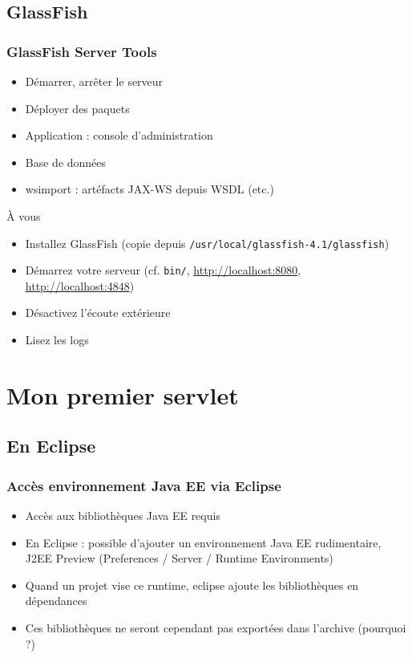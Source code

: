 \documentclass[english, french]{beamer}
\begin{document}
\subsection{GlassFish}
\begin{frame}
	\frametitle{GlassFish Server Tools}
	\begin{itemize}
		\item Démarrer, arrêter le serveur
		\item Déployer des paquets
		\item Application : console d’administration
		\item Base de données
		\item wsimport : artéfacts JAX-WS depuis WSDL (etc.)
	\end{itemize}
	\begin{block}{À vous}
		\begin{itemize}
			\item \og{}Installez\fg{} GlassFish (copie depuis \texttt{/usr/local/glassfish-4.1/glassfish})
			\item Démarrez votre serveur (cf. \texttt{bin/}, \url{http://localhost:8080}, \url{http://localhost:4848})
			\item Désactivez l’écoute extérieure
			\item Lisez les logs
		\end{itemize}
	\end{block}
\end{frame}

\section{Mon premier servlet}
\subsection{En Eclipse}
\begin{frame}
	\frametitle{Accès environnement Java EE via Eclipse}
	\begin{itemize}
		\item Accès aux bibliothèques Java EE requis
		\item En Eclipse : possible d’ajouter un environnement Java EE rudimentaire, \og{}J2EE Preview\fg{} (Preferences / Server / Runtime Environments)
		\item Quand un projet vise ce runtime, eclipse ajoute les bibliothèques en dépendances
		\item Ces bibliothèques ne seront cependant pas exportées dans l’archive (pourquoi ?)
	\end{itemize}
\end{frame}
\end{document}
